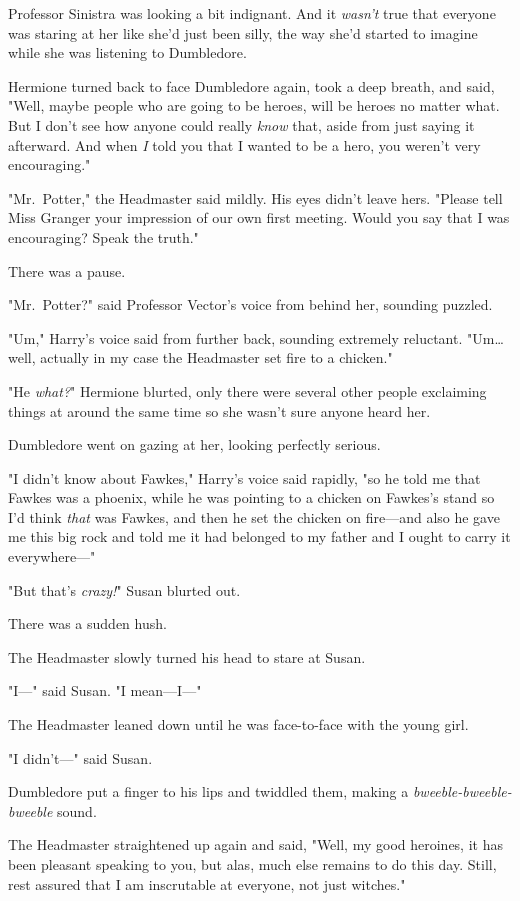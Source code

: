 Professor Sinistra was looking a bit indignant. And it \emph{wasn't} true that 
everyone was staring at her like she'd just been silly, the way she'd started 
to imagine while she was listening to Dumbledore.

Hermione turned back to face Dumbledore again, took a deep breath, and said, 
"Well, maybe people who are going to be heroes, will be heroes no matter what. 
But I don't see how anyone could really \emph{know} that, aside from just 
saying it afterward. And when \emph{I} told you that I wanted to be a hero, you 
weren't very encouraging."

"Mr.~Potter," the Headmaster said mildly. His eyes didn't leave hers. "Please 
tell Miss Granger your impression of our own first meeting. Would you say that 
I was encouraging? Speak the truth."

There was a pause.

"Mr.~Potter?" said Professor Vector's voice from behind her, sounding puzzled.

"Um," Harry's voice said from further back, sounding extremely reluctant. 
"Um{\ldots} well, actually in my case the Headmaster set fire to a chicken."

"He \emph{what?}" Hermione blurted, only there were several other people 
exclaiming things at around the same time so she wasn't sure anyone heard her.

Dumbledore went on gazing at her, looking perfectly serious.

"I didn't know about Fawkes," Harry's voice said rapidly, "so he told me that 
Fawkes was a phoenix, while he was pointing to a chicken on Fawkes's stand so 
I'd think \emph{that} was Fawkes, and then he set the chicken on fire---and 
also he gave me this big rock and told me it had belonged to my father and I 
ought to carry it everywhere---"

"But that's \emph{crazy!}" Susan blurted out.

There was a sudden hush.

The Headmaster slowly turned his head to stare at Susan.

"I---" said Susan. "I mean---I---"

The Headmaster leaned down until he was face-to-face with the young girl.

"I didn't---" said Susan.

Dumbledore put a finger to his lips and twiddled them, making a 
\emph{bweeble-bweeble-bweeble} sound.

The Headmaster straightened up again and said, "Well, my good heroines, it has 
been pleasant speaking to you, but alas, much else remains to do this day. 
Still, rest assured that I am inscrutable at everyone, not just witches."

